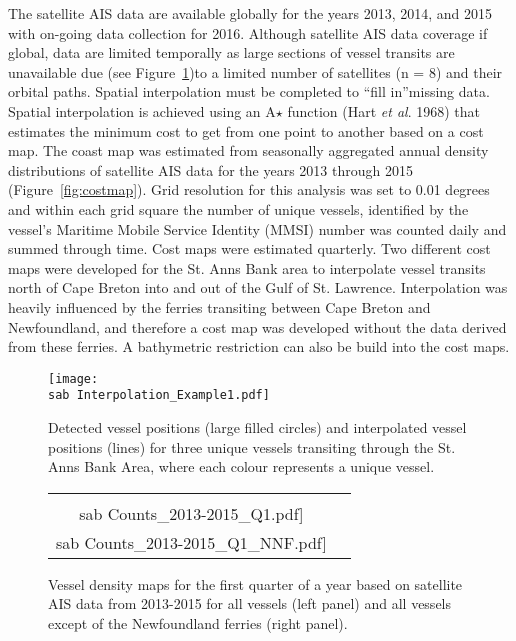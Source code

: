\documentclass[letterpaper,portrait,11pt]{scrartcl}
\numberwithin{equation}{section}		%
\numberwithin{figure}{section}		%
\numberwithin{table}{section}				%
\newcommand{\ecomod}{\string~/ecomod_data/}   %
\newcommand{\sab}{\ecomod/mpa/sab/}   %
\begin{document}
The satellite AIS data are available globally for the years 2013, 2014, and 2015 with on-going data collection for 2016. Although satellite AIS data coverage if global, data are limited temporally as large sections of vessel transits are unavailable due (see Figure~\ref{fig:astar})to a limited number of satellites (n = 8) and their orbital paths.  Spatial interpolation must be completed to \textquotedblleft fill in\textquotedblright  missing data.  Spatial interpolation is achieved using an A$\star$ function (Hart \textit{et al}. 1968)  that estimates the minimum cost to get from one point to another based on a cost map.  The coast map was estimated from seasonally aggregated annual density distributions of satellite AIS data for the years 2013 through 2015 (Figure~\ref{fig:costmap}).  Grid resolution for this analysis was set to 0.01 degrees and within each grid square the number of unique vessels, identified by the vessel's Maritime Mobile Service Identity (MMSI) number was counted daily and summed through time.  Cost maps were estimated quarterly.  Two different cost maps were developed for the St. Anns Bank area to interpolate vessel transits north of Cape Breton into and out of the Gulf of St. Lawrence.  Interpolation was heavily influenced by the ferries transiting between Cape Breton and Newfoundland, and therefore a cost map was developed without the data derived from these ferries.  A bathymetric restriction can also be build into the cost maps.

\begin{figure}[h]
	\label{fig:astar}
	\centering
	\texttt{[image: \\sab Interpolation\_Example1.pdf]}
	\caption{Detected vessel positions (large filled circles) and interpolated vessel positions (lines) for three unique vessels transiting through the St. Anns Bank Area, where each colour represents a unique vessel.}
\end{figure}


\begin{figure}[h]
	\label{fig:countmaps}
	\centering
	\begin{tabular}{cc}
		\texttt{[image: \\sab Counts\_2013-2015\_Q1.pdf]} &
		\texttt{[image: \\sab Counts\_2013-2015\_Q1\_NNF.pdf]}
	\end{tabular}
	\caption{Vessel density maps for the first quarter of a year based on satellite AIS data from 2013-2015 for all vessels (left panel) and all vessels except of the Newfoundland ferries (right panel).}
\end{figure}
\end{document}
